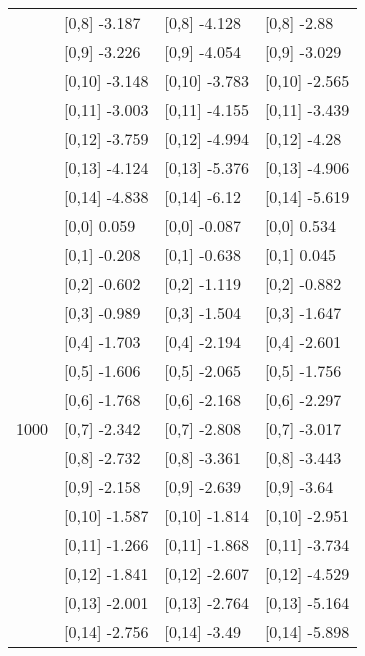 \begin{table}
\begin{tabular}[t]{llll}
 & {}[0,8] -3.187 & {}[0,8] -4.128 & {}[0,8] -2.88\\
 & {}[0,9] -3.226 & {}[0,9] -4.054 & {}[0,9] -3.029\\
\addlinespace
 & {}[0,10] -3.148 & {}[0,10] -3.783 & {}[0,10] -2.565\\
 & {}[0,11] -3.003 & {}[0,11] -4.155 & {}[0,11] -3.439\\
 & {}[0,12] -3.759 & {}[0,12] -4.994 & {}[0,12] -4.28\\
 & {}[0,13] -4.124 & {}[0,13] -5.376 & {}[0,13] -4.906\\
 & {}[0,14] -4.838 & {}[0,14] -6.12 & {}[0,14] -5.619\\
\addlinespace
 & {}[0,0] 0.059 & {}[0,0] -0.087 & {}[0,0] 0.534\\
 & {}[0,1] -0.208 & {}[0,1] -0.638 & {}[0,1] 0.045\\
 & {}[0,2] -0.602 & {}[0,2] -1.119 & {}[0,2] -0.882\\
 & {}[0,3] -0.989 & {}[0,3] -1.504 & {}[0,3] -1.647\\
 & {}[0,4] -1.703 & {}[0,4] -2.194 & {}[0,4] -2.601\\
\addlinespace
 & {}[0,5] -1.606 & {}[0,5] -2.065 & {}[0,5] -1.756\\
 & {}[0,6] -1.768 & {}[0,6] -2.168 & {}[0,6] -2.297\\
1000 & {}[0,7] -2.342 & {}[0,7] -2.808 & {}[0,7] -3.017\\
 & {}[0,8] -2.732 & {}[0,8] -3.361 & {}[0,8] -3.443\\
 & {}[0,9] -2.158 & {}[0,9] -2.639 & {}[0,9] -3.64\\
\addlinespace
 & {}[0,10] -1.587 & {}[0,10] -1.814 & {}[0,10] -2.951\\
 & {}[0,11] -1.266 & {}[0,11] -1.868 & {}[0,11] -3.734\\
 & {}[0,12] -1.841 & {}[0,12] -2.607 & {}[0,12] -4.529\\
 & {}[0,13] -2.001 & {}[0,13] -2.764 & {}[0,13] -5.164\\
 & {}[0,14] -2.756 & {}[0,14] -3.49 & {}[0,14] -5.898\\
\bottomrule
\end{tabular}
\end{table}
